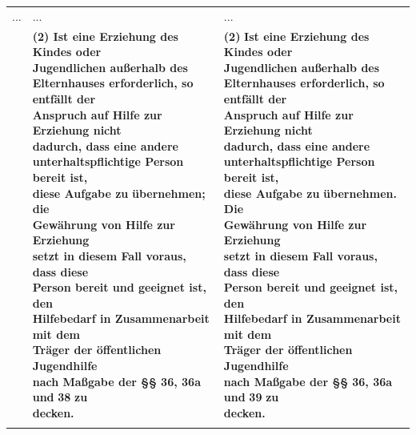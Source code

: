 \documentclass[10pt,a4paper,landscape]{article}
\begin{document}
\begin{longtable}{|L{8.2cm}|L{8.2cm}|L{8.2cm}|}
\hhline{|---|}
... & ... & ... \\
\hhline{|---|}
 & \textbf{(2) Ist eine Erziehung des Kindes oder  \newline Jugendlichen außerhalb des  \newline Elternhauses erforderlich, so entfällt der  \newline Anspruch auf Hilfe zur Erziehung nicht  \newline dadurch, dass eine andere  \newline unterhaltspflichtige Person bereit ist,  \newline diese Aufgabe zu }\textbf{\textcolor{diffred}{übernehmen; die}}\textbf{  \newline Gewährung von Hilfe zur Erziehung  \newline setzt in diesem Fall voraus, dass diese  \newline Person bereit und geeignet ist, den  \newline Hilfebedarf in Zusammenarbeit mit dem  \newline Träger der öffentlichen Jugendhilfe  \newline nach Maßgabe der \S{}\S{} 36, 36a und }\textbf{\textcolor{diffred}{38}}\textbf{ zu  \newline decken. } & \textbf{(2)} \textbf{Ist eine Erziehung des Kindes oder  \newline Jugendlichen außerhalb des  \newline Elternhauses erforderlich, so entfällt der  \newline Anspruch auf Hilfe zur Erziehung nicht  \newline dadurch, dass eine andere  \newline unterhaltspflichtige Person bereit ist,  \newline diese Aufgabe zu }\textbf{\textcolor{diffgreen}{übernehmen. Die}}\textbf{  \newline Gewährung von Hilfe zur Erziehung  \newline setzt in diesem Fall voraus, dass diese  \newline Person bereit und geeignet ist, den  \newline Hilfebedarf in Zusammenarbeit mit dem  \newline Träger der öffentlichen Jugendhilfe  \newline nach Maßgabe der \S{}\S{} 36, 36a und }\textbf{\textcolor{diffgreen}{39}}\textbf{ zu  \newline decken.  } \\
\hhline{|---|}

\end{longtable}
\end{document}
